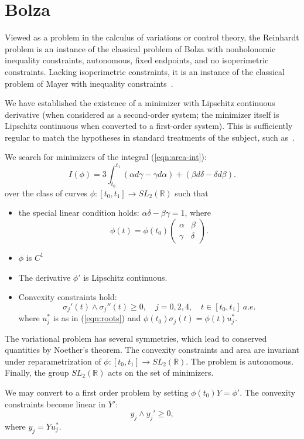 \documentclass[11pt]{amsart}
\newcommand{\ring}[1]{\mathbb{#1}}
\begin{document}
\section{Bolza}


Viewed as a problem in the calculus of variations or control theory,
the Reinhardt problem is an instance of the classical problem of Bolza
with nonholonomic inequality constraints, autonomous, fixed endpoints,
and no isoperimetric constraints.  Lacking isoperimetric constraints,
it is an instance of the classical problem of Mayer with inequality
constraints~\cite[Ch.7]{Hestenes:1966}.


We have established the existence of a minimizer with Lipschitz
continuous derivative (when considered as a second-order system; the
minimizer itself is Lipschitz continuous when converted to a
first-order system).  This is sufficiently regular to match the
hypotheses in standard treatments of the subject, such as~\cite{Pontryagin:1986}.


We search for minimizers of the integral (\ref{eqn:area-int}):
\begin{equation}
I(\phi) = 3\int_{t_0}^{t_1} (\alpha d\gamma - 
\gamma d\alpha) + (\beta d\delta - \delta d\beta).
\end{equation}
over the class of curves $\phi:[t_0,t_1]\to SL_2(\ring{R})$ such that 
\begin{itemize}
\item the special linear condition holds: $\alpha\delta-\beta\gamma=1$, where
 \[
\phi(t) = \phi(t_0)
\left(\begin{matrix}\alpha&\beta\\\gamma&\delta\end{matrix}\right).
\]
\item $\phi$ is $C^1$
\item The derivative $\phi'$ is Lipschitz continuous.
\item Convexity constraints hold:
  \[\sigma_j'(t) \land \sigma_j''(t) \ge 0,\quad j=0,2,4,\quad t\in[t_0,t_1]~a.e.\]
where $u^*_j$ is as in (\ref{eqn:roots}) and $\phi(t_0)\sigma_j(t) = \phi(t) u^*_j$.
\end{itemize}


The variational problem has several symmetries, which lead to
conserved quantities by Noether's theorem.  The convexity
constraints and area are invariant under reparametrization of
$\phi:[t_0,t_1]\to SL_2(\ring{R})$.  The problem is autonomous.
Finally, the group $SL_2(\ring{R})$ acts on the set of minimizers.

We may convert to a first order problem by setting $\phi(t_0)Y =
\phi'$.  The convexity constraints become linear in $Y'$:
\begin{equation}\label{eqn:curvature}
  y_j \land y_j' \ge 0,
\end{equation}
where $y_j = Y u^*_j$.

\raggedright

\end{document}
